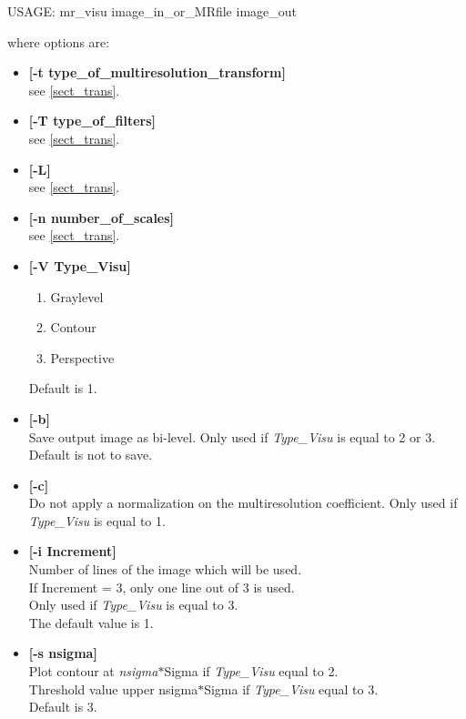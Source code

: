 {\bf
\begin{center}
 USAGE: mr\_visu image\_in\_or\_MRfile  image\_out
\end{center}}
where options are:
\begin{itemize}
\baselineskip=0.4truecm
\itemsep=0.1truecm
\item {\bf [-t type\_of\_multiresolution\_transform]} \\
  see \ref{sect_trans}.
\item {\bf [-T type\_of\_filters]}  \\
  see \ref{sect_trans}.
\item {\bf [-L]} \\
  see \ref{sect_trans}.
\item {\bf [-n number\_of\_scales]} \\
  see \ref{sect_trans}.
\item {\bf [-V Type\_Visu]}
\begin{enumerate}
\baselineskip=0.4truecm
\item Graylevel
\item Contour
\item Perspective
\end{enumerate}
 Default is 1.
\item {\bf [-b]} \\
 Save output image as bi-level.  Only used if {\em Type\_Visu} is 
equal to 2 or 3.
 Default is not to save.
\item {\bf [-c]} \\
 Do not apply a normalization on the multiresolution coefficient.
Only used if {\em Type\_Visu} is equal to 1.
 \item {\bf [-i Increment]} \\
 Number of lines of the image which will be used. \\
 If Increment = 3, only one line out of 3 is used. \\
 Only used if  {\em Type\_Visu} is equal to 3. \\
The default value is 1.
\item {\bf [-s nsigma]} \\
Plot contour at {\em nsigma}$*$Sigma if  {\em Type\_Visu} equal to 2. \\
Threshold value upper nsigma$*$Sigma if  {\em Type\_Visu} equal to 3. \\
Default is 3. 
\end{itemize}


